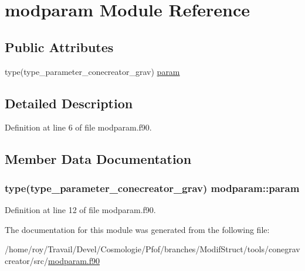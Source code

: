 \hypertarget{classmodparam}{\section{modparam Module Reference}
\label{classmodparam}
}
\subsection*{Public Attributes}
\begin{DoxyCompactItemize}
\item 
type(type\-\_\-parameter\-\_\-conecreator\-\_\-grav) \hyperlink{classmodparam_a3cdea4d6103638af1f6ab9b4bd81bdd6}{param}
\end{DoxyCompactItemize}


\subsection{Detailed Description}


Definition at line 6 of file modparam.\-f90.



\subsection{Member Data Documentation}
\hypertarget{classmodparam_a3cdea4d6103638af1f6ab9b4bd81bdd6}{
\subsubsection[{param}]{\setlength{\rightskip}{0pt plus 5cm}type(type\-\_\-parameter\-\_\-conecreator\-\_\-grav) modparam\-::param}}\label{classmodparam_a3cdea4d6103638af1f6ab9b4bd81bdd6}


Definition at line 12 of file modparam.\-f90.



The documentation for this module was generated from the following file\-:\begin{DoxyCompactItemize}
\item 
/home/roy/\-Travail/\-Devel/\-Cosmologie/\-Pfof/branches/\-Modif\-Struct/tools/conegravcreator/src/\hyperlink{modparam_8f90}{modparam.\-f90}\end{DoxyCompactItemize}

